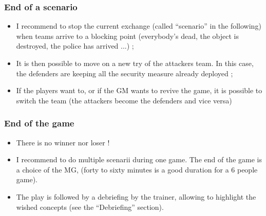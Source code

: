 \documentclass[11pt]{article} %
\begin{document}
\subsubsection{End of a scenario}
\begin{itemize}
\item I recommend to stop the current exchange (called ``scenario'' in the following) when teams arrive to a blocking point (everybody's dead, the object is destroyed, the police has arrived ...) ;
\item It is then possible to move on a new try of the attackers team. In this case, the defenders are keeping all the security measure already deployed ; 
\item If the players want to, or if the GM wants to revive the game, it is possible to switch the team (the attackers become the defenders and vice versa)
\end{itemize}

\subsubsection{End of the game}
\begin{itemize}
\item There is no winner nor loser !
\item I recommend to do multiple scenarii during one game.  The end of the game is a choice of the MG, (forty to sixty minutes is a good duration for a 6 people game).
\item The play is followed by a debriefing by the trainer, allowing to highlight the wished concepts (see the ``Debriefing'' section).
\end{itemize}
	
\end{document}
